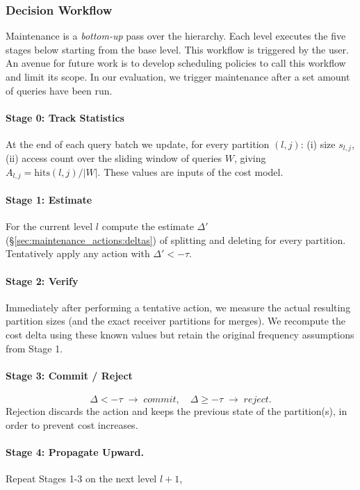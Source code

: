 \subsubsection{Decision Workflow}
\label{sec:maintenance_actions:workflow}

Maintenance is a \textit{bottom-up} pass over the hierarchy.  
Each level executes the five stages below starting from the base level. This workflow is triggered by the user. An avenue for future work is to develop scheduling policies to call this workflow and limit its scope. In our evaluation, we trigger maintenance after a set amount of queries have been run.

\paragraph{Stage 0: Track Statistics}
At the end of each query batch we update, for every partition
$(l,j)$: (i) size $s_{l,j}$, (ii) access count over the sliding window of queries 
$W$, giving $A_{l,j}= \text{hits}(l,j)/|W|$.
These values are inputs of the cost model.

\paragraph{Stage 1: Estimate}
For the current level $l$ compute the estimate
$\Delta'$ (\S\ref{sec:maintenance_actions:deltas}) of splitting and deleting for every
partition.  Tentatively apply any action with $\Delta' < -\tau$.

\paragraph{Stage 2: Verify}
Immediately after performing a tentative action, we measure the actual resulting partition sizes (and the exact receiver partitions for merges). We recompute the cost delta using these known values but retain the original frequency assumptions from Stage 1.

\paragraph{Stage 3: Commit / Reject}
\[
\Delta<-\tau\;\rightarrow\;\textit{commit},\quad
\Delta\ge-\tau\;\rightarrow\;\textit{reject}.
\]
Rejection discards the action and keeps the previous state of the partition(s), in order to prevent cost increases.

\paragraph{Stage 4: Propagate Upward.}
Repeat Stages 1-3 on the next level $l{+}1$,  

